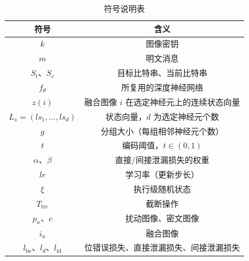 \begin{table}[htbp]
    \centering
    \caption{符号说明表}
    \label{tab:symbols}
    {\renewcommand{\arraystretch}{1.4}
    \begin{tabular}{cc}
        \hline
        符号 & 含义 \\
        \hline
        \(k\) & 图像密钥 \\
        \(m\) & 明文消息 \\
        \(S_t\)、\(S_c\) & 目标比特串、当前比特串 \\
        \(f_\theta\) & 所复用的深度神经网络 \\
        \(z(i)\) & 融合图像 \(i\) 在选定神经元上的连续状态向量 \\
        \(L_s=(ls_1,\dots,ls_d)\) & 状态向量，\(d\) 为选定神经元个数 \\
        \(g\) & 分组大小（每组相邻神经元个数） \\
        \(t\) & 编码阈值，\(t\in(0,1)\) \\
        \(\alpha\)、\(\beta\) & 直接/间接泄漏损失的权重 \\
        \(lr\) & 学习率（更新步长） \\
        \(\xi\) & 执行级随机状态 \\
        \(T_{\mathrm{trc}}\) & 截断操作 \\
        \(p_n\)、\(c\) & 扰动图像、密文图像 \\
        \(i_n\) & 融合图像 \\
        \(l_{\mathrm{be}}\)、\(l_d\)、\(l_{\mathrm{id}}\) & 位错误损失、直接泄漏损失、间接泄漏损失 \\
        \hline
    \end{tabular}}
\end{table}

